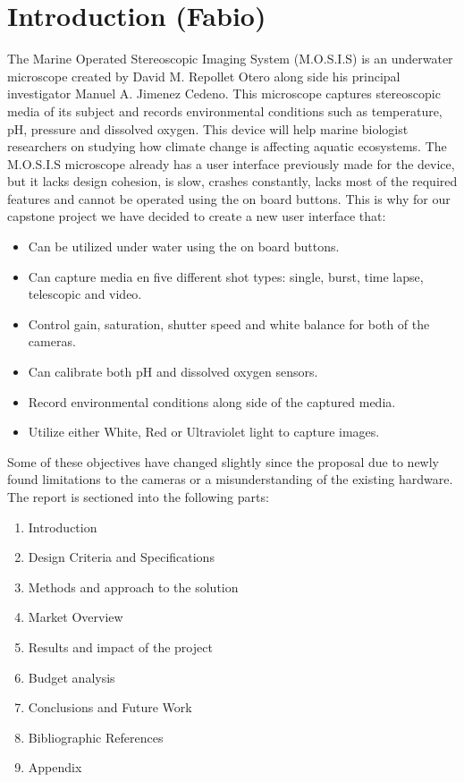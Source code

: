 \section{Introduction (Fabio)}
The Marine Operated Stereoscopic Imaging System (M.O.S.I.S) is an underwater microscope created by David M. Repollet Otero along side his principal investigator Manuel A. Jimenez Cedeno. This microscope captures stereoscopic media of its subject and records environmental conditions such as temperature, pH, pressure and dissolved oxygen. This device will help marine biologist researchers on studying how climate change is affecting aquatic ecosystems. The M.O.S.I.S microscope already has a user interface previously made for the device, but it lacks design cohesion, is slow, crashes constantly, lacks most of the required features and cannot be operated using the on board buttons. This is why for our capstone project we have decided to create a new user interface that:
\begin{itemize}
	\item Can be utilized under water using the on board buttons.
	\item Can capture media en five different shot types: single, burst, time lapse, telescopic and video.
	\item Control gain, saturation, shutter speed and white balance for both of the cameras.
	\item Can calibrate both pH and dissolved oxygen sensors.
	\item Record environmental conditions along side of the captured media.
	\item Utilize either White, Red or Ultraviolet light to capture images.
\end{itemize}
Some of these objectives have changed slightly since the proposal due to newly found limitations to the cameras or a misunderstanding of the existing hardware.\\
The report is sectioned into the following parts:
\begin{enumerate}
	\item Introduction
	\item Design Criteria and Specifications
	\item Methods and approach to the solution
	\item Market Overview
	\item Results and impact of the project
	\item Budget analysis
	\item Conclusions and Future Work
	\item Bibliographic References
	\item Appendix
\end{enumerate}